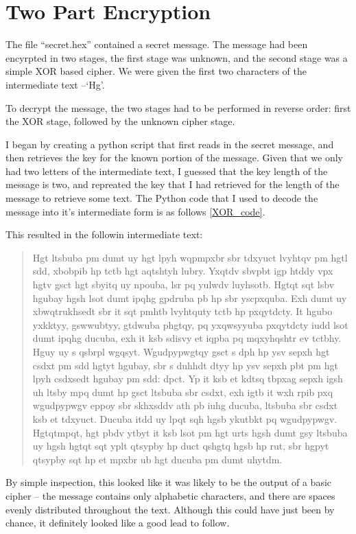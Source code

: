 \documentclass[11pt,a4paper,twoside]{article}
\begin{document}
\vfill
\pagebreak
\section{Two Part Encryption}
The file ``secret.hex'' contained a secret message. The message had been
encyrpted in two stages, the first stage was unknown, and the second stage was
a simple XOR based cipher. We were given the first two characters of the
intermediate text --`Hg'.

To decrypt the message, the two stages had to be performed in reverse order:
first the XOR stage, followed by the unknown cipher stage. 

I began by creating a python script that first reads in the secret message, and
then retrieves the key for the known portion of the message. Given that we only
had two letters of the intermediate text, I guessed that the key length of the
message is two, and repreated the key that I had retrieved for the length of
the message to retrieve some text. The Python code that I used to decode the
message into it's intermediate form is as follows \ref{XOR_code}.


This resulted in the followin intermediate text: 

\begin{quote}
\small
\raggedright
Hgt ltsbuba pm dumt uy hgt lpyh wqpmpxbr sbr tdxyuct lvyhtqv pm hgtl sdd,
xbobpib hp tctb hgt aqtshtyh lubry.  Yxqtdv sbvpbt igp htddy vpx hgtv gsct hgt
sbyitq uy npouba, lsr pq yulwdv luyhsotb.  Hgtqt sqt lsbv hgubay hgsh lsot dumt
ipqhg gpdruba pb hp sbr yscpxquba. Exh dumt uy xbwqtrukhsedt sbr it sqt pmhtb
lvyhtquty tctb hp pxqytdcty.  It hgubo yxkktyy, gswwubtyy, gtdwuba phgtqy, pq
yxqwsyyuba pxqytdcty iudd lsot dumt ipqhg ducuba, exh it ksb sdisvy et iqpba pq
mqxyhqshtr ev tctbhy. Hguy uy s qsbrpl wgqsyt.  Wgudpypwgtqy gsct s dph hp ysv
sepxh hgt csdxt pm sdd hgtyt hgubay, sbr s duhhdt dtyy hp ysv sepxh pbt pm hgt
lpyh csdxsedt hgubay pm sdd: dpct. Yp it ksb et kdtsq tbpxag sepxh igsh uh
ltsby mpq dumt hp gsct ltsbuba sbr csdxt, exh igtb it wxh rpib pxq wgudpypwgv
eppoy sbr skhxsddv ath pb iuhg ducuba, ltsbuba sbr csdxt ksb et tdxyuct. Ducuba
itdd uy lpqt sqh hgsb ykutbkt pq wgudpypwgv.  Hgtqtmpqt,  hgt pbdv ytbyt it ksb
lsot pm hgt urts hgsh dumt gsy ltsbuba uy hgsh hgtqt sqt yplt qtsypby hp duct
qshgtq hgsb hp rut, sbr hgpyt qtsypby sqt hp et mpxbr ub hgt ducuba pm dumt
uhytdm.
\end{quote}

By simple inspection, this looked like it was likely to be the output of a
basic cipher -- the message contains only alphabetic characters, and there are
spaces evenly distributed throughout the text. Although this could have just
been by chance, it definitely looked like a good lead to follow.
\end{document}

